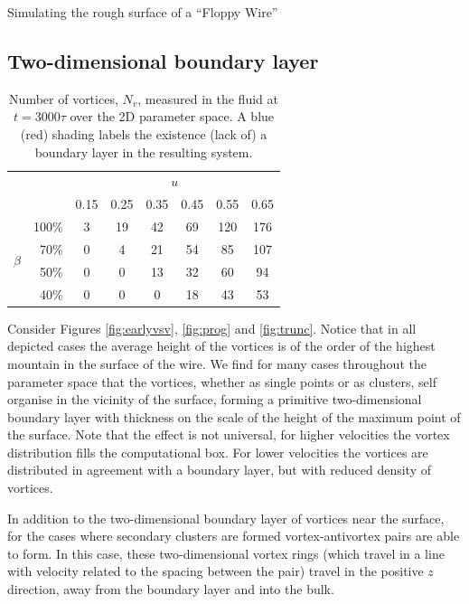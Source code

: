 \begin{chapter}{\label{cha:afm}Simulating the rough surface of a ``Floppy Wire''}
\subsection{Two-dimensional boundary layer}
\begin{table}
\centering
\begin{tabular}{cr|cccccc}
   & & \multicolumn{6}{c}{$u$}\\
   & & 0.15 & 0.25 & 0.35 & 0.45 & 0.55 & 0.65 \\
   \hline
  \multirow{4}{*}{$\beta$} & 100\% & \cellcolor{blue!50}3 & \cellcolor{blue!50}19 & \cellcolor{blue!50}42 & \cellcolor{red!50}69 & \cellcolor{red!50}120 & \cellcolor{red!50}176 \\
   &70\%& 0 & \cellcolor{blue!50}4 &  \cellcolor{blue!50}21 & \cellcolor{red!50}54 & \cellcolor{red!50}85 & \cellcolor{red!50}107 \\
   &50\%& 0 & 0 &  \cellcolor{blue!50}13 & \cellcolor{blue!50}32 & \cellcolor{red!50}60 & \cellcolor{red!50}94 \\
   &40\%& 0 & 0 &   0 & \cellcolor{blue!50}18 & \cellcolor{blue!50}43 & \cellcolor{red!50}53 \\
\end{tabular}
\caption{\label{tbl:nv_bl}Number of vortices, $N_v$, measured in the fluid at $t=3000\tau$ over the 2D parameter space. A blue (red) shading labels the existence (lack of) a boundary layer in the resulting system.}
\end{table}

Consider Figures \ref{fig:earlyvsv}, \ref{fig:prog} and \ref{fig:trunc}. Notice that in all depicted cases the average height of the vortices is of the order of the highest mountain in the surface of the wire. We find for many cases throughout the parameter space that the vortices, whether as single points or as clusters, self organise in the vicinity of the surface, forming a primitive two-dimensional boundary layer with thickness on the scale of the height of the maximum point of the surface. Note that the effect is not universal, for higher velocities the vortex distribution fills the computational box. For lower velocities the vortices are distributed in agreement with a boundary layer, but with reduced density of vortices.

In addition to the two-dimensional boundary layer of vortices near the surface, for the cases where secondary clusters are formed vortex-antivortex pairs are able to form. In this case, these two-dimensional vortex rings (which travel in a line with velocity related to the spacing between the pair) travel in the positive $z$ direction, away from the boundary layer and into the bulk.


\end{chapter}
